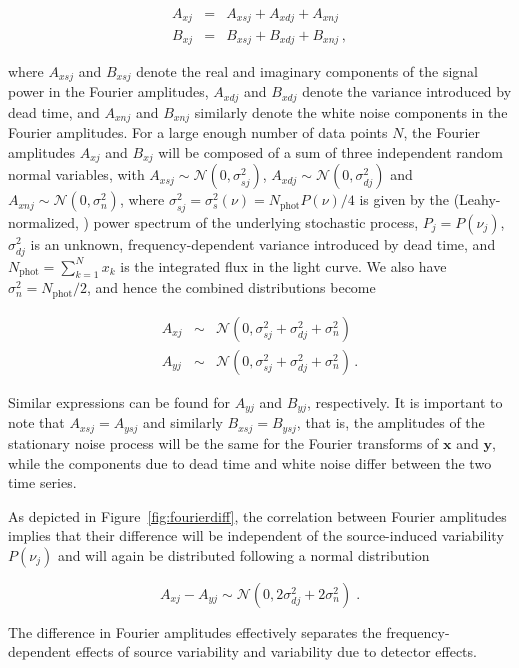 \documentclass[twocolumn]{aastex61}
\newcommand{\Normal}{\ensuremath{{\mathcal N}}\xspace}
\begin{document}
\begin{eqnarray}
A_{xj} &=& A_{xsj} + A_{xdj} + A_{xnj} \nonumber \\
B_{xj} &=& B_{xsj} + B_{xdj} + B_{xnj} \, ,
\end{eqnarray}

\noindent where $A_{xsj}$ and $B_{xsj}$ denote the real and imaginary components of the signal power in the Fourier amplitudes,  $A_{xdj}$ and $B_{xdj}$ denote the variance introduced by dead time, and $A_{xnj}$ and $B_{xnj}$ similarly denote the white noise components in the Fourier amplitudes.
For a large enough number of data points $N$, the Fourier amplitudes $A_{xj}$ and $B_{xj}$ will be composed of a sum of three independent random normal variables, with $A_{xsj} \sim \Normal(0, \sigma_{sj}^2)$,  $A_{xdj} \sim \Normal(0, \sigma_{dj}^2)$ and $A_{xnj} \sim \Normal(0, \sigma_n^2)$, where $\sigma_{sj}^2 = \sigma_{s}^2(\nu) = N_\mathrm{phot}P(\nu)/4$ is given by the (Leahy-normalized, \citealt{Leahy+83}) power spectrum of the underlying stochastic process, $P_j = P(\nu_j)$, $\sigma_{dj}^2$ is an unknown, frequency-dependent variance introduced by dead time, and $N_{\mathrm{phot}} = \sum_{k=1}^{N}{x_k}$ is the integrated flux in the light curve. We also have $\sigma_n^2 = N_\mathrm{phot}/2$, and hence the combined distributions become

\begin{eqnarray}
A_{xj} &\sim & \Normal(0, \sigma_{sj}^2 + \sigma_{dj}^2 + \sigma_{n}^2) \nonumber \\
A_{yj} &\sim & \Normal(0, \sigma_{sj}^2 + \sigma_{dj}^2 + \sigma_{n}^2) \nonumber \, .
\end{eqnarray}

\noindent Similar expressions can be found for $A_{yj}$ and $B_{yj}$, respectively. It is important to note that $A_{xsj} = A_{ysj}$ and similarly $B_{xsj} = B_{ysj}$, that is, the amplitudes of the stationary noise process will be the same for the Fourier transforms of $\mathbf{x}$ and $\mathbf{y}$, while the components due to dead time and white noise differ between the two time series.

As depicted in Figure~\ref{fig:fourierdiff}, the correlation between Fourier amplitudes implies that their difference will be independent of the source-induced variability $P(\nu_j)$ and will again be distributed following a normal distribution 

\[
A_{xj} - A_{yj} \sim \Normal(0, 2\sigma_{dj}^2 + 2\sigma_{n}^2) \; .
\]

\noindent The difference in Fourier amplitudes effectively separates the frequency-dependent effects of source variability and variability due to detector effects.
\end{document}
